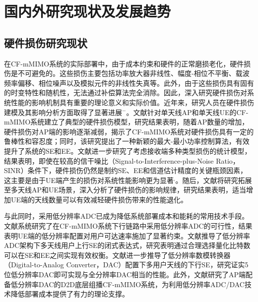 \section{国内外研究现状及发展趋势}

\subsection{硬件损伤研究现状}

在CF-mMIMO系统的实际部署中，由于成本约束和硬件的正常磨损老化，硬件损伤是不可避免的\cite{chapterone18}。这些损伤主要包括功率放大器非线性、幅度-相位不平衡、载波频率偏移、相位噪声以及模拟元件的非线性失真等。此外，由于这些损伤具有固有的时变特性和随机性，无法通过补偿算法完全消除。因此，深入研究硬件损伤对系统性能的影响机制具有重要的理论意义和实际价值。近年来，研究人员在硬件损伤建模及其影响分析方面取得了显著进展\cite{chapterone18}$^-$\cite{chapterone21}。文献\textcite{chapterone18}针对单天线AP和单天线UE的CF-mMIMO系统建立了典型的硬件损伤模型，研究结果表明，随着AP数量的增加，硬件损伤对AP端的影响逐渐减弱，揭示了CF-mMIMO系统对硬件损伤具有一定的鲁棒性和容忍度；同时，该研究提出了一种新颖的最大-最小功率控制算法，有效提升了系统的SE和EE。文献\textcite{chapterone22}进一步研究了考虑接收端多种类型损伤的统计模型，结果表明，即使在较高的信干噪比（Signal-to-Interference-plus-Noise Ratio，SINR）条件下，硬件损伤仍然是制约SE、EE和信道估计精度的关键瓶颈因素，这主要是由于UE端产生的损伤对系统性能影响更为显著\cite{chapterone23}$^,$\cite{chapterone24}。随后，文献\textcite{chapterone25}将研究拓展至多天线AP和UE场景，深入分析了硬件损伤的影响规律，研究结果表明，适当增加UE端的天线数量可以有效减轻硬件损伤带来的性能退化。

与此同时，采用低分辨率ADC已成为降低系统部署成本和能耗的常用技术手段。文献\textcite{chapterone26}系统研究了在CF-mMIMO系统下行链路中采用低分辨率ADC的可行性，结果表明UE端的低分辨率配置对用户可达速率施加了显著约束。文献\cite{chapterone27}推导了低分辨率ADC架构下多天线用户上行SE的闭式表达式，研究表明通过合理选择量化比特数可以在SE和EE之间实现有效权衡。文献\textcite{chapterone28}进一步推导了低分辨率数模转换器（Digital-to-Analog Converter，DAC）配置下多用户天线的下行SE，研究证实5位低分辨率DAC即可实现与全分辨率DAC相当的性能。此外，文献\textcite{chapterone29}研究了AP端配备低分辨率DAC的D2D底层组播CF-mMIMO系统，为利用低分辨率ADC/DAC技术降低部署成本提供了有力的理论支撑。


